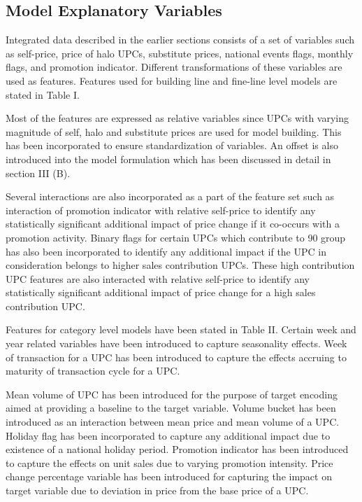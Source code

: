 \subsection{Model Explanatory Variables}
Integrated data described in the earlier sections consists of a set of variables such as self-price, price of halo UPCs, 
substitute prices, national events flags, monthly flags, and promotion indicator. Different transformations of these 
variables are used as features. Features used for building line and fine-line level models are stated in Table I.

Most of the features are expressed as relative variables since UPCs with varying magnitude of self, halo and substitute 
prices are used for model building. This has been incorporated to ensure standardization of variables. An offset is also 
introduced into the model formulation which has been discussed in detail in section III (B).

Several interactions are also incorporated as a part of the feature set such as interaction of promotion indicator 
with relative self-price to identify any statistically significant additional impact of price change if it co-occurs 
with a promotion activity. Binary flags for certain UPCs which contribute to 90%
group has also been incorporated to identify any additional impact if the UPC in consideration belongs to higher sales 
contribution UPCs. These high contribution UPC features are also interacted with relative self-price to identify any 
statistically significant additional impact of price change for a high sales contribution UPC.

Features for category level models have been stated in Table II. Certain week and year related variables have been introduced 
to capture seasonality effects. Week of transaction for a UPC has been introduced to capture the effects accruing to maturity 
of transaction cycle for a UPC.

Mean volume of UPC has been introduced for the purpose of target encoding aimed at providing a baseline to the target 
variable. Volume bucket has been introduced as an interaction between mean price and mean volume of a UPC. Holiday flag 
has been incorporated to capture any additional impact due to existence of a national holiday period. Promotion indicator 
has been introduced to capture the effects on unit sales due to varying promotion intensity. Price change percentage 
variable has been introduced for capturing the impact on target variable due to deviation in price from the base price of a UPC.

